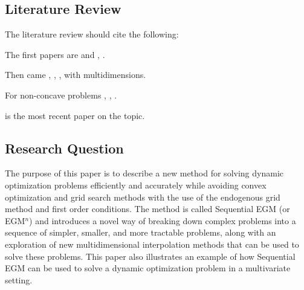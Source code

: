 \documentclass[\econtexRoot/SequentialEGM]{subfiles}
\begin{document}
\subsection{Literature Review} %


The literature review should cite the following:

\cite{Druedahl2021-wl,Ludwig2018-uz,Ludwig2016-tq,Iskhakov2015-jy,Maliar2013-sv,Carroll2006-wq,Jorgensen2013-du,Maliar2014-qj,Scheidegger2019-xf,Bodie1992-yp,Maliar2011-dj,White2015-fg,Hintermaier2010-io,Barillas2007-uh,Druedahl2017-vn,Clausen2020-zo,Carroll2009-zq,Iskhakov2017-my,Mendoza2020-jd,Fella2014-my}

The first papers are \cite{Carroll2006-wq} and \cite{Barillas2007-uh}, \cite{Hintermaier2010-io}.

Then came \cite{White2015-fg}, \cite{Iskhakov2015-jy}, \cite{Ludwig2018-uz},  with multidimensions.

For non-concave problems \cite{Fella2014-my}, \cite{Druedahl2017-vn}, \cite{Iskhakov2017-my}.

\cite{Druedahl2021-wl} is the most recent paper on the topic.



\subsection{Research Question} %


The purpose of this paper is to describe a new method for solving dynamic optimization problems efficiently and accurately while avoiding convex optimization and grid search methods with the use of the endogenous grid method and first order conditions. The method is called Sequential EGM (or EGM$^n$) and introduces a novel way of breaking down complex problems into a sequence of simpler, smaller, and more tractable problems, along with an exploration of new multidimensional interpolation methods that can be used to solve these problems. This paper also illustrates an example of how Sequential EGM can be used to solve a dynamic optimization problem in a multivariate setting.
\end{document}
